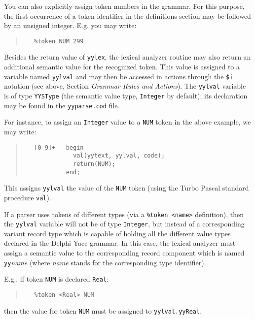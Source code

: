\documentclass[a4paper]{article}
\begin{document}
You can also explicitly assign token numbers in the grammar. For this
purpose, the first occurrence of a token identifier in the definitions
section may be followed by an unsigned integer. E.g. you may write:
\begin{quote}\begin{verbatim}
   %token NUM 299
\end{verbatim}\end{quote}

Besides the return value of \verb"yylex", the lexical analyzer routine may
also return an additional semantic value for the recognized token. This value
is assigned to a variable named \verb"yylval" and may then be accessed in
actions through the \verb"$i" notation (see above, Section {\em Grammar
Rules and Actions\/}). The \verb"yylval" variable is of type \verb"YYSType"
(the semantic value type, \verb"Integer" by default); its declaration may be
found in the \verb"yyparse.cod" file.

For instance, to assign an \verb"Integer" value to a \verb"NUM" token in the
above example, we may write:

\begin{quote}\begin{verbatim}
   [0-9]+   begin
              val(yytext, yylval, code);
              return(NUM);
            end;
\end{verbatim}\end{quote}

This assigns \verb"yylval" the value of the \verb"NUM" token (using the Turbo
Pascal standard procedure \verb"val").

If a parser uses tokens of different types (via a \verb"%token <name>"
definition), then the \verb"yylval" variable will not be of type
\verb"Integer", but instead of a corresponding variant record type which is
capable of holding all the different value types declared in the Delphi Yacc
grammar. In this case, the lexical analyzer must assign a semantic value to
the corresponding record component which is named \verb"yy"{\em name\/}
(where {\em name\/} stands for the corresponding type identifier).

E.g., if token \verb"NUM" is declared \verb"Real":
\begin{quote}\begin{verbatim}
   %token <Real> NUM
\end{verbatim}\end{quote}
then the value for token \verb"NUM" must be assigned to \verb"yylval.yyReal".
\end{document}
